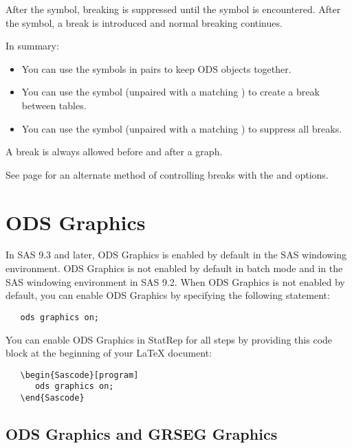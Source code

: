 \documentclass[article,oneside]{memoir}
\newcommand*{\StatRep}{\textsf{StatRep}\xspace}
\begin{document}
  After the \Code{<} symbol, breaking is suppressed until the \Code{>} symbol is encountered.  
  After the \Code{>} symbol, a break is introduced and normal breaking continues.
  
  In summary:
  \begin{itemize}
  \item You can use the \Code{<>} symbols in pairs to keep ODS objects together. 
  \item You can use the \Code{>} symbol (unpaired with a matching \Code{<}) to create a break between tables. 
  \item You can use the \Code{<} symbol (unpaired with a matching \Code{>}) to suppress all breaks.
  \end{itemize}
  
  A break is always allowed before and after a graph.
  
  See page \pageref{skiplast} for an alternate method of controlling breaks
  with the  and  options.
 
 \section{ODS Graphics}

 In SAS 9.3 and later, ODS Graphics is enabled by default in the SAS windowing environment.  
 ODS Graphics is not enabled by default in batch mode and in the SAS windowing environment in SAS 9.2.
 When ODS Graphics is not enabled by default, you can enable ODS Graphics by specifying the following statement:

\begin{snugshade}
\begin{verbatim}
   ods graphics on;
\end{verbatim}
\end{snugshade}


You can enable ODS Graphics in \StatRep for all steps by providing this code block at the 
beginning of your LaTeX document:

\begin{snugshade}
\begin{verbatim}
   \begin{Sascode}[program]
      ods graphics on;
   \end{Sascode}
\end{verbatim}
\end{snugshade}

 \subsection{ODS Graphics and GRSEG Graphics}
 \label{grseg}
 
\end{document}
